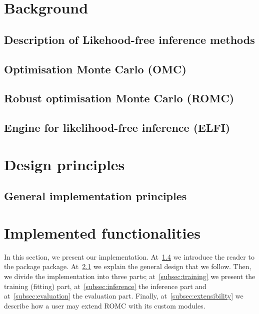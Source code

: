 \documentclass[article]{jss}
\begin{document}
\clearpage
\section{Background}


\subsection{Description of Likehood-free inference methods}


\subsection{Optimisation Monte Carlo (OMC)}


\subsection{Robust optimisation Monte Carlo (ROMC)}


\subsection{Engine for likelihood-free inference (ELFI)}
\label{subsec:ELFI}


\section{Design principles}  %




\subsection{General implementation principles}
\label{subsec:general_design}


\section{Implemented functionalities}

In this section, we present our implementation. At~\ref{subsec:ELFI}
we introduce the reader to the  package 
package. At~\ref{subsec:general_design} we explain the general design
that we follow. Then, we divide the implementation into three parts;
at~\ref{subsec:training} we present the training (fitting) part,
at~\ref{subsec:inference} the inference part and
at~\ref{subsec:evaluation} the evaluation part. Finally,
at~\ref{subsec:extensibility} we describe how a user may extend ROMC
with its custom modules.
\end{document}
